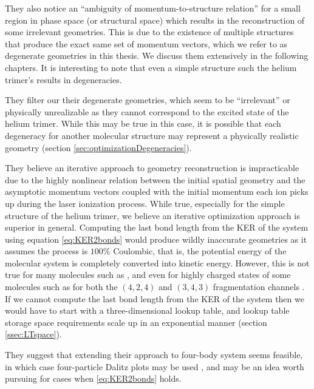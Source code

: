 They also notice an ``ambiguity of momentum-to-structure relation'' for a small region in phase space (or structural space) which results in the reconstruction of some irrelevant geometries. This is due to the existence of multiple structures that produce the exact same set of momentum vectors, which we refer to as degenerate geometries in this thesis. We discuss them extensively in the following chapters. It is interesting to note that even a simple structure such the helium trimer's results in degeneracies.

They filter our their degenerate geometries, which seem to be ``irrelevant'' or physically unrealizable as they cannot correspond to the excited state of the helium trimer. While this may be true in this case, it is possible that each degeneracy for another molecular structure may represent a physically realistic geometry (section \ref{sec:optimizationDegeneracies}).

They believe an iterative approach to geometry reconstruction is impracticable due to the highly nonlinear relation between the initial spatial geometry and the asymptotic momentum vectors coupled with the initial momentum each ion picks up during the laser ionization process. While true, especially for the simple structure of the helium trimer, we believe an iterative optimization approach is superior in general. Computing the last bond length from the KER of the system using equation \eqref{eq:KER2bonds} would produce wildly inaccurate geometries as it assumes the process is $100\%$ Coulombic, that is, the potential energy of the molecular system is completely converted into kinetic energy. However, this is not true for many molecules such as  \citep{Wales14}, and even for highly charged states of some molecules such as  for both the $(4,2,4)$ and $(3,4,3)$ fragmentation channels \citep{Matsuda14}. If we cannot compute the last bond length from the KER of the system then we would have to start with a three-dimensional lookup table, and lookup table storage space requirements scale up in an exponential manner (section \ref{ssec:LTspace}). 

They suggest that extending their approach to four-body system seems feasible, in which case four-particle Dalitz plots may be used \citep{Schulz07}, and may be an idea worth pursuing for cases when \eqref{eq:KER2bonds} holds.


